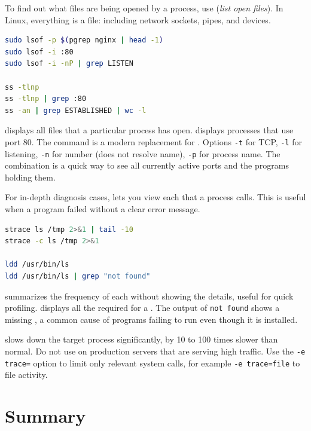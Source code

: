 To find out what files are being opened by a process, use
 (\emph{list open files}). In Linux, everything is a file:
including network sockets, pipes, and devices.

\begin{lstlisting}[language=bash, caption={Monitor open files and network connections}]
sudo lsof -p $(pgrep nginx | head -1)
sudo lsof -i :80
sudo lsof -i -nP | grep LISTEN

ss -tlnp
ss -tlnp | grep :80
ss -an | grep ESTABLISHED | wc -l
\end{lstlisting}

 displays all files that a particular process has open.  displays processes that use port 80. The  command is a modern replacement for . Options \texttt{-t} for TCP, \texttt{-l} for listening, \texttt{-n} for number (does not resolve name), \texttt{-p} for process name. The combination  is a quick way to see all currently active ports and the programs holding them.

For in-depth diagnosis cases,  lets you view each
 that a process calls. This is useful when a program
failed without a clear error message.

\begin{lstlisting}[language=bash, caption={Deep analysis with strace and ldd}]
strace ls /tmp 2>&1 | tail -10
strace -c ls /tmp 2>&1

ldd /usr/bin/ls
ldd /usr/bin/ls | grep "not found"
\end{lstlisting}

 summarizes the frequency of each  without showing the details,
useful for quick profiling.  displays all the  required for a . The output of \texttt{not found} shows a missing , a common cause of programs failing to run even though it is installed.

\begin{warningbox}
 slows down the target process significantly, by 10 to 100
times slower than normal. Do not use on production servers that are serving high traffic. Use the \texttt{-e trace=} option to limit only relevant system calls, for example \texttt{-e trace=file} to file activity.
\end{warningbox}

\section{Summary}
\label{sec:appmanagement-summary}

